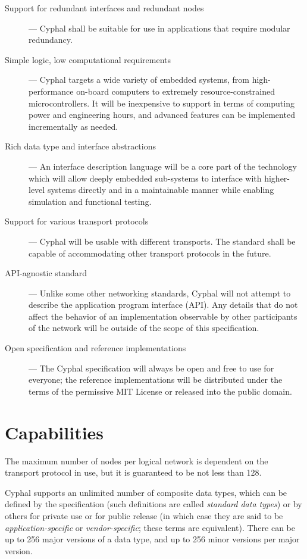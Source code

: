 \begin{description}
    \item[Support for redundant interfaces and redundant nodes] --- Cyphal shall be suitable for use in
    applications that require modular redundancy.

    \item[Simple logic, low computational requirements] --- Cyphal targets a wide variety of embedded systems,
    from high-performance on-board computers to extremely resource-constrained microcontrollers.
    It will be inexpensive to support in terms of computing power and engineering hours,
    and advanced features can be implemented incrementally as needed.

    \item[Rich data type and interface abstractions] --- An interface description language will be a core part of
    the technology which will allow deeply embedded sub-systems to interface with higher-level systems directly and
    in a maintainable manner while enabling simulation and functional testing.

    \item[Support for various transport protocols] --- Cyphal will be usable with different transports.
    The standard shall be capable of accommodating other transport protocols in the future.

    \item[API-agnostic standard] --- Unlike some other networking standards, Cyphal will not attempt to describe
    the application program interface (API). Any details that do not affect the behavior of an implementation
    observable by other participants of the network will be outside of the scope of this specification.

    \item[Open specification and reference implementations] --- The Cyphal specification will always be open and
    free to use for everyone; the reference implementations will be distributed under the terms of
    the permissive MIT License or released into the public domain.
\end{description}

\section{Capabilities}

The maximum number of nodes per logical network is dependent on the transport protocol in use,
but it is guaranteed to be not less than 128.

Cyphal supports an unlimited number of composite data types,
which can be defined by the specification (such definitions are called \emph{standard data types})
or by others for private use or for public release
(in which case they are said to be \emph{application-specific} or \emph{vendor-specific}; these terms are equivalent).
There can be up to 256 major versions of a data type, and up to 256 minor versions per major version.

